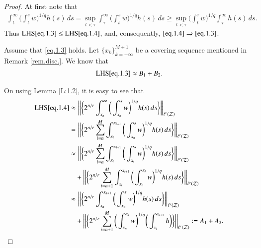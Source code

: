 \documentclass[12pt]{amsart}
\theoremstyle{plain}
\theoremstyle{definition}
\numberwithin{thm}{section}
\numberwithin{equation}{section}
\begin{document}
\begin{proof}
	At first note that
	\begin{align*}
	\int_t^{\infty} \bigg( \int_t^s w \bigg)^{1 / q}  h(s) \,ds = \sup_{t < \tau} \int_{\tau}^{\infty} \bigg( \int_t^s w \bigg)^{1 / q}  h(s) \,ds \ge \sup_{t < \tau} \bigg( \int_t^{\tau} w \bigg)^{1 / q} \int_{\tau}^{\infty}  h(s) \,ds.
	\end{align*}	
	Thus ${\operatorname{LHS}}{\eqref{eq.1.3}} \le {\operatorname{LHS}}{\eqref{eq.1.4}}$, and, consequently, $\eqref{eq.1.4} \Rightarrow \eqref{eq.1.3}$.
	
	Assume that \eqref{eq.1.3} holds. Let $\{x_k\}_{k=-\infty}^{M + 1}$ be a covering sequence mentioned in Remark \ref{rem.disc.}. We know that
	\begin{align*}
	{\operatorname{LHS}}{\eqref{eq.1.3}}  \approx B_1 + B_2.
	\end{align*}

	On using Lemma \ref{L:1.2}, it is easy to see that
	\begin{align*}
	{\operatorname{LHS}}{\eqref{eq.1.4}}  \approx &  \,\, \bigg\| \bigg\{ 2^{n / r}  \int_{x_n}^{\infty} \bigg(
	\int_{x_n}^s w \bigg)^{1 / q} h(s) \,ds \bigg\} \bigg\|_{\ell^r ({\mathcal Z})} \\
	= & \,\, \bigg\| \bigg\{ 2^{n / r}  \sum_{i = n}^M \int_{x_i}^{x_{i+1}} \bigg(
	\int_{x_n}^s w \bigg)^{1 / q} h(s) \,ds \bigg\} \bigg\|_{\ell^r ({\mathcal Z})} \\
	\approx & \,\,\bigg\| \bigg\{ 2^{n / r}  \sum_{i = n}^M \int_{x_i}^{x_{i+1}} \bigg(
	\int_{x_i}^s w \bigg)^{1 / q} h(s) \,ds \bigg\} \bigg\|_{\ell^r ({\mathcal Z})} \\
	& + \bigg\| \bigg\{ 2^{n / r} \sum_{i = n + 1}^M \int_{x_i}^{x_{i+1}} \bigg(
	\int_{x_n}^{x_i} w \bigg)^{1 / q} h(s) \,ds \bigg\} \bigg\|_{\ell^r ({\mathcal Z})} \\
	\approx & \,\,\bigg\| \bigg\{ 2^{n / r}  \int_{x_n}^{x_{n+1}} \bigg(
	\int_{x_n}^s w \bigg)^{1 / q} h(s) \,ds \bigg\} \bigg\|_{\ell^r ({\mathcal Z})} \\
	& + \bigg\| \bigg\{ 2^{n / r}  \sum_{i = n + 1}^M \bigg(
	\int_{x_n}^{x_i} w \bigg)^{1 / q} \bigg( \int_{x_i}^{x_{i+1}} h \bigg) \bigg\} \bigg\|_{\ell^r ({\mathcal Z})} : = A_1 + A_2.	
	\end{align*}


\end{proof}
\end{document}
